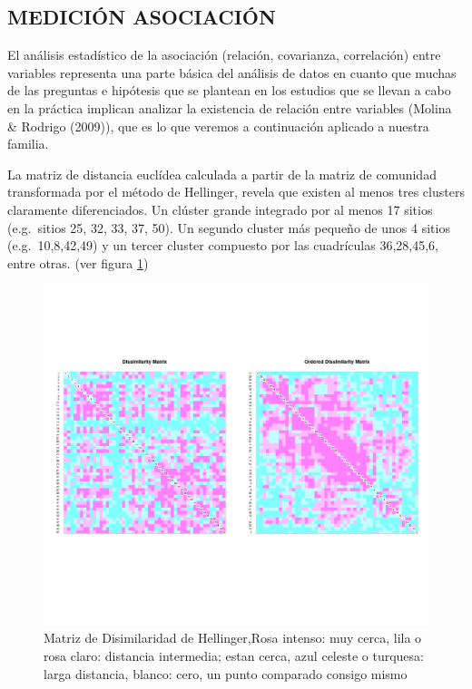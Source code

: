 \documentclass[11pt,]{article}
\begin{document}
\subsection{MEDICIÓN ASOCIACIÓN}\label{mediciuxf3n-asociaciuxf3n}

El análisis estadístico de la asociación (relación, covarianza,
correlación) entre variables representa una parte básica del análisis de
datos en cuanto que muchas de las preguntas e hipótesis que se plantean
en los estudios que se llevan a cabo en la práctica implican analizar la
existencia de relación entre variables (Molina \& Rodrigo (2009)), que
es lo que veremos a continuación aplicado a nuestra familia.

La matriz de distancia euclídea calculada a partir de la matriz de
comunidad transformada por el método de Hellinger, revela que existen al
menos tres clusters claramente diferenciados. Un clúster grande
integrado por al menos 17 sitios (e.g.~sitios 25, 32, 33, 37, 50). Un
segundo cluster más pequeño de unos 4 sitios (e.g.~10,8,42,49) y un
tercer cluster compuesto por las cuadrículas 36,28,45,6, entre otras.
(ver figura \ref{fig:diss_hellinger})

\begin{figure}
\centering
\includegraphics{diss_hellinger.png}
\caption{\label{fig:diss_hellinger}Matriz de Disimilaridad de
Hellinger,Rosa intenso: muy cerca, lila o rosa claro: distancia
intermedia; estan cerca, azul celeste o turquesa: larga distancia,
blanco: cero, un punto comparado consigo mismo}
\end{figure}
\end{document}

